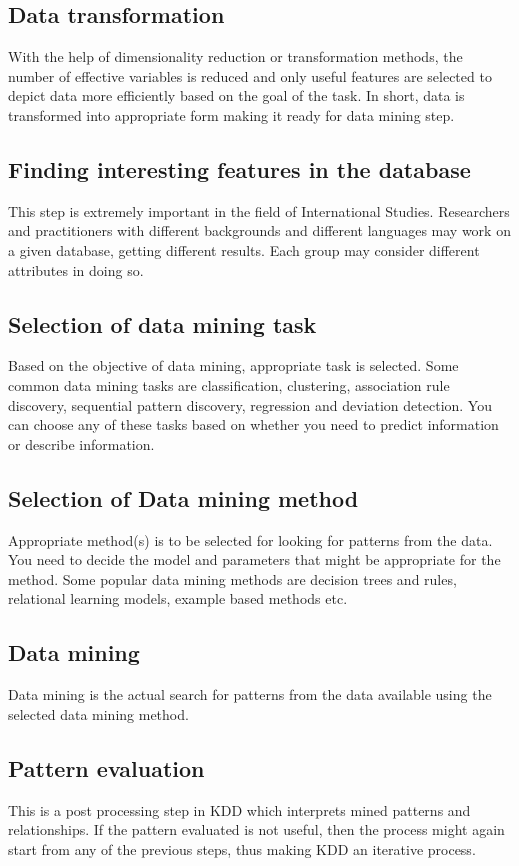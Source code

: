 \subsection{Data transformation}
With the help of dimensionality reduction or transformation methods, the number of effective variables is reduced and only useful features are selected to depict data more efficiently based on the goal of the task. In short, data is transformed into appropriate form making it ready for data mining step.
\subsection{Finding interesting features in the database}
This step is extremely important in the field of International Studies. Researchers and practitioners with different backgrounds and different languages may work on a given database, getting different results. Each group may consider different attributes in doing so.
\subsection{Selection of data mining task}
Based on the objective of data mining, appropriate task is selected. Some common data mining tasks are classification, clustering, association rule discovery, sequential pattern discovery, regression and deviation detection. You can choose any of these tasks based on whether you need to predict information or describe information.
\subsection{Selection of Data mining method}
Appropriate method(s) is to be selected for looking for patterns from the data. You need to decide the model and parameters that might be appropriate for the method. Some popular data mining methods are decision trees and rules, relational learning models, example based methods etc.
\subsection{Data mining}
Data mining is the actual search for patterns from the data available using the selected data mining method.
\subsection{Pattern evaluation}
This is a post processing step in KDD which interprets mined patterns and relationships. If the pattern evaluated is not useful, then the process might again start from any of the previous steps, thus making KDD an iterative process.
